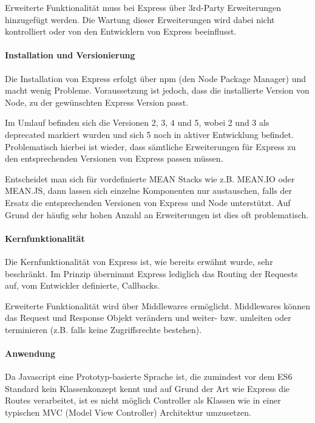 \documentclass[]{article}
\begin{document}
Erweiterte Funktionalität muss bei Express über 3rd-Party Erweiterungen
hinzugefügt werden. Die Wartung dieser Erweiterungen wird dabei nicht
kontrolliert oder von den Entwicklern von Express beeinflusst.

\paragraph{Installation und
Versionierung}\label{installation-und-versionierung}

Die Installation von Express erfolgt über npm (den Node Package Manager)
und macht wenig Probleme. Voraussetzung ist jedoch, dass die
installierte Version von Node, zu der gewünschten Express Version passt.

Im Umlauf befinden sich die Versionen 2, 3, 4 und 5, wobei 2 und 3 als
deprecated markiert wurden und sich 5 noch in aktiver Entwicklung
befindet. Problematisch hierbei ist wieder, dass sämtliche Erweiterungen
für Express zu den entsprechenden Versionen von Express passen müssen.

Entscheidet man sich für vordefinierte MEAN Stacks wie z.B. MEAN.IO oder
MEAN.JS, dann lassen sich einzelne Komponenten nur austauschen, falls
der Ersatz die entsprechenden Versionen von Express und Node
unterstützt. Auf Grund der häufig sehr hohen Anzahl an Erweiterungen ist
dies oft problematisch.

\paragraph{Kernfunktionalität}\label{kernfunktionalituxe4t}

Die Kernfunktionalität von Express ist, wie bereits erwähnt wurde, sehr
beschränkt. Im Prinzip übernimmt Express lediglich das Routing der
Requests auf, vom Entwickler definierte, Callbacks.

Erweiterte Funktionalität wird über Middlewares ermöglicht. Middlewares
können das Request und Response Objekt verändern und weiter- bzw.
umleiten oder terminieren (z.B. falls keine Zugriffsrechte bestehen).

\paragraph{Anwendung}\label{anwendung}

Da Javascript eine Prototyp-basierte Sprache ist, die zumindest vor dem
ES6 Standard kein Klassenkonzept kennt und auf Grund der Art wie Express
die Routes verarbeitet, ist es nicht möglich Controller als Klassen wie
in einer typischen MVC (Model View Controller) Architektur umzusetzen.
\end{document}
